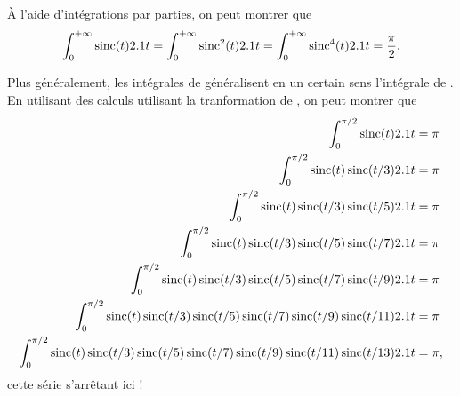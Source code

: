 À l'aide d'intégrations par parties, on peut montrer que
\[
\int_0^{+\infty} \sinc(t) \d t
= \int_0^{+\infty} \sinc^2(t) \d t
= \int_0^{+\infty} \sinc^4(t) \d t
= \frac{\pi}{2}.
\]

Plus généralement, les intégrales de  généralisent en un certain sens l'intégrale de . En utilisant des calculs utilisant la tranformation de , on peut montrer que
\begin{align*}
\int_0^{\pi/2} \sinc(t) \d t &= \pi\\
\int_0^{\pi/2} \sinc(t) \sinc(t/3) \d t &= \pi\\
\int_0^{\pi/2} \sinc(t) \sinc(t/3) \sinc(t/5) \d t &= \pi\\
\int_0^{\pi/2} \sinc(t) \sinc(t/3) \sinc(t/5) \sinc(t/7) \d t &= \pi\\
\int_0^{\pi/2} \sinc(t) \sinc(t/3) \sinc(t/5) \sinc(t/7) \sinc(t/9) \d t &= \pi\\
\int_0^{\pi/2} \sinc(t) \sinc(t/3) \sinc(t/5) \sinc(t/7) \sinc(t/9) \sinc(t/11) \d t &= \pi\\
\int_0^{\pi/2} \sinc(t) \sinc(t/3) \sinc(t/5) \sinc(t/7) \sinc(t/9) \sinc(t/11) \sinc(t/13) \d t &= \pi,
\end{align*}
cette série s'arrêtant ici ! 